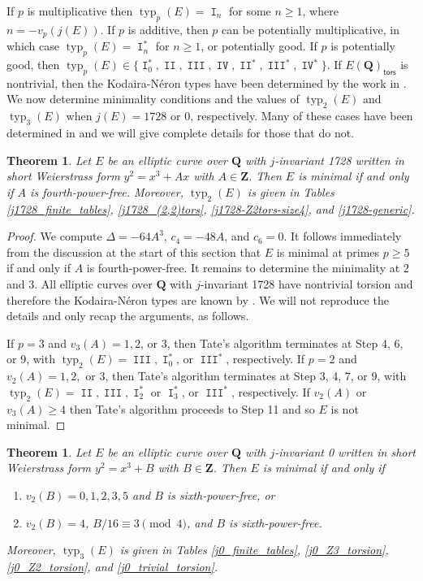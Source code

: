 \documentclass{amsart}
\newcommand{\Z}{\mathbf{Z}}
\newcommand{\Q}{\mathbf{Q}}
\newcommand{\tors}{\mathsf{tors}}
\DeclareMathOperator{\typ}{{typ}}
\DeclareMathOperator{\I}{\mathtt{I}}
\DeclareMathOperator{\II}{\mathtt{II}}
\DeclareMathOperator{\III}{\mathtt{III}}
\DeclareMathOperator{\IV}{\mathtt{IV}}
\numberwithin{equation}{section}
\theoremstyle{plain}
\newtheorem{thm}[equation]{Theorem}
\theoremstyle{remark}
\begin{document}
If $p$ is multiplicative then $\typ_p(E) = \I_n$ for some $n \geq 1$, where $n = -v_p(j(E))$.  If $p$ is additive, then $p$ can be potentially multiplicative, in which case $\typ_p(E) = \I_n^*$ for $n \geq 1$, or potentially good.  If $p$ is potentially good, then $\typ_p(E) \in \lbrace \I_0^*, \II, \III, \IV, \II^*, \III^*, \IV^* \rbrace$.    If $E(\Q)_\tors$ is nontrivial, then the Kodaira-N\'eron types have been  determined by the work in \cite{br}. We now determine minimality conditions and the values of $\typ_2(E)$ and $\typ_3(E)$ when $j(E) = 1728$ or $0$, respectively.  Many of these cases have been determined in \cite{br} and we will give complete details for those that do not.

\begin{thm} \label{1728_min_thm}
Let $E$ be an elliptic curve over $\Q$ with $j$-invariant 1728 written in short Weierstrass form $y^2 = x^3 + Ax$ with $A \in \Z$. Then $E$ is minimal if and only if  $A$ is fourth-power-free.  Moreover, $\typ_2(E)$ is given in Tables \ref{j1728_finite_tables}, \ref{j1728_(2,2)tors},  \ref{j1728-Z2tors-size4}, and \ref{j1728-generic}. 
\end{thm}

\begin{proof}
We compute $\Delta = -64A^3$, $c_4 = -48A$, and $c_6=0$.  It follows immediately from the discussion at the start of this section that $E$ is minimal at primes $p\geq 5$ if and only if $A$ is fourth-power-free.  It remains to determine the minimality at $2$ and $3$.  All elliptic curves over $\Q$ with $j$-invariant 1728 have nontrivial torsion and therefore the Kodaira-N\'eron types are known by  \cite[Thms.~3.1, 3.4, 3.7]{br}.  We will not reproduce the details and only recap the arguments, as follows.

If $p=3$ and $v_3(A) = 1,2$, or 3, then Tate's algorithm terminates at Step 4, 6, or 9, with $\typ_2(E) = \III, \I_0^*$,  or $\III^*$, respectively. If $p=2$ and $v_2(A) = 1,2,$ or $3$, then Tate's algorithm terminates at Step 3, 4, 7, or 9, with $\typ_2(E) = \II, \III, \I_2^*$ or $\I_3^*$,  or $\III^*$, respectively.    If $v_2(A)$ or $v_3(A) \geq 4$ then Tate's algorithm proceeds to Step 11 and so $E$ is not minimal.  
\end{proof}

\begin{thm} \label{0_min_thm}
Let $E$ be an elliptic curve over $\Q$ with $j$-invariant 0 written in short Weierstrass form $y^2 = x^3 + B$ with $B \in \Z$. Then $E$ is minimal if and only if
\begin{enumerate}
\item $v_2(B) = 0,1,2,3,5$ and $B$ is sixth-power-free, or
\item $v_2(B) = 4$, $B/16 \equiv 3 \pmod{4}$, and $B$ is sixth-power-free.
\end{enumerate} 
Moreover, $\typ_3(E)$  is given in Tables \ref{j0_finite_tables}, \ref{j0_Z3_torsion}, \ref{j0_Z2_torsion}, and \ref{j0_trivial_torsion}.
\end{thm}
\end{document}
